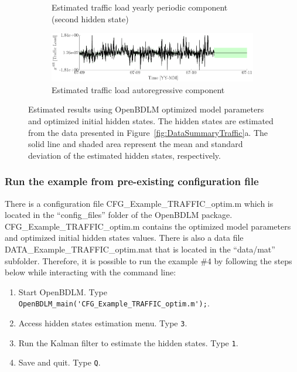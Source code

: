 \begin{figure}[h!]
\begin{center}
\begin{subfigure}{\linewidth}
\caption{Estimated traffic load yearly periodic component (second hidden state)}
\end{subfigure}
\begin{subfigure}{\linewidth}\centering
\includegraphics[width=0.9\linewidth]{./docfigs/Example_TRAFFIC/optim_param_optim_initialhiddenstate/TrafficLoad_AR_4.pdf} 
\caption{Estimated traffic load autoregressive component}
\end{subfigure}
\caption{Estimated results using OpenBDLM optimized model parameters and optimized initial hidden states. The hidden states are estimated from the data presented in Figure~\ref{fig:DataSummaryTraffic}a. The solid line and shaded area represent the mean and standard deviation of the estimated hidden states, respectively.}
\label{fig:Example_TrafficOptimizedOptimized}
\end{center}
\end{figure}



\subsubsection{Run the example from pre-existing configuration file}
\label{SS:LoadConfigFileTraffic}


There is a configuration file CFG\_Example\_TRAFFIC\_optim.m which is located in the ``config\_files'' folder of the OpenBDLM package.
CFG\_Example\_TRAFFIC\_optim.m contains the optimized model parameters and optimized initial hidden states values.
There is also a data file DATA\_Example\_TRAFFIC\_optim.mat that is located in the ``data/mat'' subfolder.
Therefore, it is possible to run the example \#4 by following the steps below while interacting with the \MATLAB{} command line:
\begin{enumerate}
\item Start OpenBDLM. Type \colorbox{light-gray}{\lstinline[basicstyle = \mlttfamily \small, backgroundcolor = \color{light-gray}]!OpenBDLM_main('CFG_Example_TRAFFIC_optim.m');!}.
\item Access hidden states estimation menu. Type \colorbox{light-gray}{\lstinline[basicstyle = \mlttfamily \small, backgroundcolor = \color{light-gray}]!3!}.
\item Run the Kalman filter to estimate the hidden states. Type \colorbox{light-gray}{\lstinline[basicstyle = \mlttfamily \small, backgroundcolor = \color{light-gray}]!1!}.
\item Save and quit. Type \colorbox{light-gray}{\lstinline[basicstyle = \mlttfamily \small, backgroundcolor = \color{light-gray}]!Q!}.
\end{enumerate}


